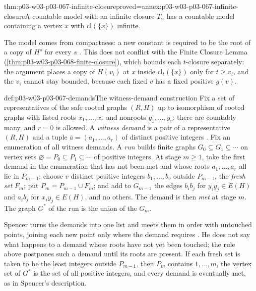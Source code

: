 \begin{hbtheorem}{thm:p03-w03-p03-067-infinite-closure}{proved=annex:p03-w03-p03-067-infinite-closure}{A countable model with an infinite closure}
\(T_\alpha\) has a countable model containing a vertex \(x\) with
\(\mathrm{cl}(\{x\})\) infinite.
\end{hbtheorem}

The model comes from compactness: a new constant is required to be the root
of a copy of \(H^s\) for every \(s\)
\cite[p.~14]{Spencer2007LogicRandomStructuresAuthor}.  This does not
conflict with the Finite Closure Lemma
(\cref{thm:p03-w03-p03-068-finite-closure}), which bounds each
\(t\)-closure separately: the argument places a copy of \(H(v_i)\) at \(x\)
inside \(\mathrm{cl}_t(\{x\})\) only for \(t\geq v_i\), and the \(v_i\)
cannot stay bounded, because each fixed \(v\) has a fixed positive
\(g(v)\).

\begin{hbdefinition}{def:p03-w03-p03-067-demands}{The witness-demand construction}
Fix a set of representatives of the safe rooted graphs \((R,H)\) up to
isomorphism of rooted graphs with listed roots \(x_1,\ldots,x_r\) and
nonroots \(y_1,\ldots,y_v\); there are countably many, and \(r=0\) is
allowed.  A \emph{witness demand} is a pair of a representative \((R,H)\)
and a tuple \(\bar a=(a_1,\ldots,a_r)\) of distinct positive integers
\cite[p.~14]{Spencer2007LogicRandomStructuresAuthor}.  Fix an enumeration
of all witness demands.  A \emph{run} builds finite graphs
\(G_0\subseteq G_1\subseteq\cdots\) on vertex sets
\(\varnothing=P_0\subseteq P_1\subseteq\cdots\) of positive integers.  At
stage \(m\geq1\), take the first demand in the enumeration that has not been
met and whose roots \(a_1,\ldots,a_r\) all lie in \(P_{m-1}\); choose \(v\)
distinct positive integers \(b_1,\ldots,b_v\) outside \(P_{m-1}\), the
\emph{fresh set} \(F_m\); put \(P_m=P_{m-1}\cup F_m\); and add to
\(G_{m-1}\) the edges \(b_ib_j\) for \(y_iy_j\in E(H)\) and \(a_ib_j\) for
\(x_iy_j\in E(H)\), and no others.  The demand is then \emph{met} at stage
\(m\).  The graph \(G^\ast\) of the run is the union of the \(G_m\).
\end{hbdefinition}

Spencer turns the demands into one list and meets them in order with
untouched points, joining each new point only where the demand requires
\cite[p.~14]{Spencer2007LogicRandomStructuresAuthor}.  He does not say what
happens to a demand whose roots have not yet been touched; the rule above
postpones such a demand until its roots are present.  If each fresh set is
taken to be the least integers outside \(P_{m-1}\), then \(P_m\) contains
\(1,\ldots,m\), the vertex set of \(G^\ast\) is the set of all positive
integers, and every demand is eventually met, as in Spencer's description.

